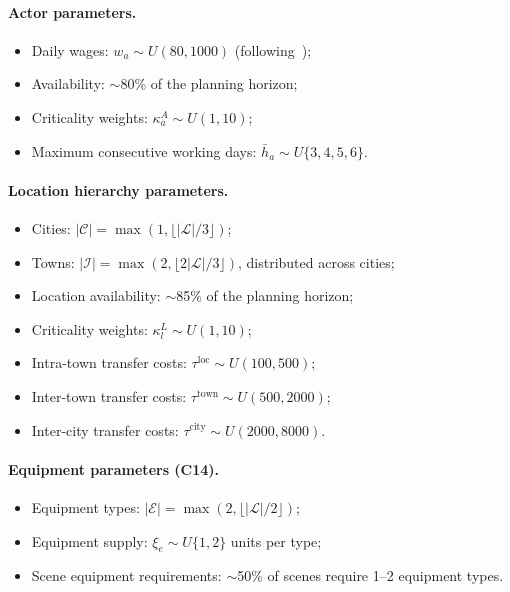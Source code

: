 \paragraph{Actor parameters.}
\begin{itemize}
    \item Daily wages: $w_a \sim U(80, 1000)$ (following~\citet{liu2019});
    \item Availability: $\sim$80\% of the planning horizon;
    \item Criticality weights: $\kappa^A_a \sim U(1, 10)$;
    \item Maximum consecutive working days: $\bar{h}_a \sim U\{3, 4, 5, 6\}$.
\end{itemize}

\paragraph{Location hierarchy parameters.}
\begin{itemize}
    \item Cities: $|\mathcal{C}| = \max(1, \lfloor |\mathcal{L}|/3 \rfloor)$;
    \item Towns: $|\mathcal{I}| = \max(2, \lfloor 2|\mathcal{L}|/3 \rfloor)$, distributed across cities;
    \item Location availability: $\sim$85\% of the planning horizon;
    \item Criticality weights: $\kappa^L_l \sim U(1, 10)$;
    \item Intra-town transfer costs: $\tau^{\text{loc}} \sim U(100, 500)$;
    \item Inter-town transfer costs: $\tau^{\text{town}} \sim U(500, 2000)$;
    \item Inter-city transfer costs: $\tau^{\text{city}} \sim U(2000, 8000)$.
\end{itemize}

\paragraph{Equipment parameters (C14).}
\begin{itemize}
    \item Equipment types: $|\mathcal{E}| = \max(2, \lfloor |\mathcal{L}|/2 \rfloor)$;
    \item Equipment supply: $\xi_e \sim U\{1, 2\}$ units per type;
    \item Scene equipment requirements: $\sim$50\% of scenes require 1--2 equipment types.
\end{itemize}

